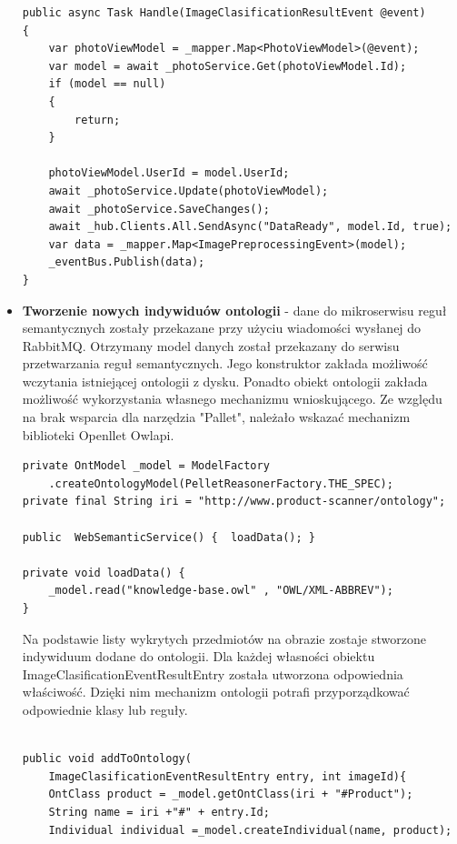 \begin{itemize}
\begin{lstlisting}[caption={Przekazanie danych do aplikacji mobilnej oraz mikroserwisu reguł semantycznych.}]
public async Task Handle(ImageClasificationResultEvent @event)
{
	var photoViewModel = _mapper.Map<PhotoViewModel>(@event);
	var model = await _photoService.Get(photoViewModel.Id);
	if (model == null)
	{
		return;
	}
	
	photoViewModel.UserId = model.UserId;
	await _photoService.Update(photoViewModel);
	await _photoService.SaveChanges();
	await _hub.Clients.All.SendAsync("DataReady", model.Id, true);
	var data = _mapper.Map<ImagePreprocessingEvent>(model);
	_eventBus.Publish(data);
}
\end{lstlisting}

\item \textbf{Tworzenie nowych indywiduów ontologii} - dane do mikroserwisu reguł semantycznych zostały przekazane przy użyciu wiadomości wysłanej do RabbitMQ. Otrzymany model danych został przekazany do serwisu przetwarzania reguł semantycznych. Jego konstruktor zakłada możliwość wczytania istniejącej ontologii z dysku. Ponadto obiekt ontologii zakłada możliwość wykorzystania własnego mechanizmu wnioskującego. Ze względu na brak wsparcia dla narzędzia "Pallet", należało wskazać mechanizm biblioteki Openllet Owlapi.


\begin{lstlisting}[caption={Stworzenie instancji modelu ontologii.}]
private OntModel _model = ModelFactory
	.createOntologyModel(PelletReasonerFactory.THE_SPEC);
private final String iri = "http://www.product-scanner/ontology";

public  WebSemanticService() {	loadData(); }

private void loadData() {
	_model.read("knowledge-base.owl" , "OWL/XML-ABBREV");
}

\end{lstlisting}
Na podstawie listy wykrytych przedmiotów na obrazie zostaje stworzone indywiduum dodane do ontologii. Dla każdej własności obiektu ImageClasificationEventResultEntry została utworzona odpowiednia właściwość. Dzięki nim mechanizm ontologii potrafi przyporządkować odpowiednie klasy lub reguły.
\begin{lstlisting}[caption={Dodanie danych do ontologii.}]

public void addToOntology(
	ImageClasificationEventResultEntry entry, int imageId){
	OntClass product = _model.getOntClass(iri + "#Product");
	String name = iri +"#" + entry.Id;
	Individual individual =_model.createIndividual(name, product);
	

\end{lstlisting}
\end{itemize}
